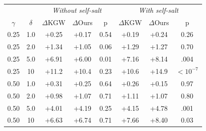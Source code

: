 \begin{tabular}{@{}cc|ccc|ccc@{}}
\toprule
& & \multicolumn{3}{c|}{\textit{Without self-salt}} & \multicolumn{3}{c}{\textit{With self-salt}} \\
$\gamma$ & $\delta$ & $\Delta$KGW & $\Delta$Ours & p & $\Delta$KGW & $\Delta$Ours & p \\
\midrule
0.25 & 1.0 & +0.25 & +0.17 & 0.54 & +0.19 & +0.24 & 0.26 \\
0.25 & 2.0 & +1.34 & +1.05 & 0.06 & +1.29 & +1.27 & 0.70 \\
0.25 & 5.0 & +6.91 & +6.00 & 0.01 & +7.16 & +8.14 & .004 \\
0.25 & 10 & +11.2 & +10.4 & 0.23 & +10.6 & +14.9 & $<10^{-7}$ \\
0.50 & 1.0 & +0.31 & +0.25 & 0.64 & +0.26 & +0.15 & 0.97 \\
0.50 & 2.0 & +0.98 & +1.07 & 0.71 & +1.11 & +1.07 & 0.80 \\
0.50 & 5.0 & +4.01 & +4.19 & 0.25 & +4.15 & +4.78 & .001 \\
0.50 & 10 & +6.63 & +6.74 & 0.71 & +7.66 & +8.40 & 0.03 \\
\bottomrule
\end{tabular}

